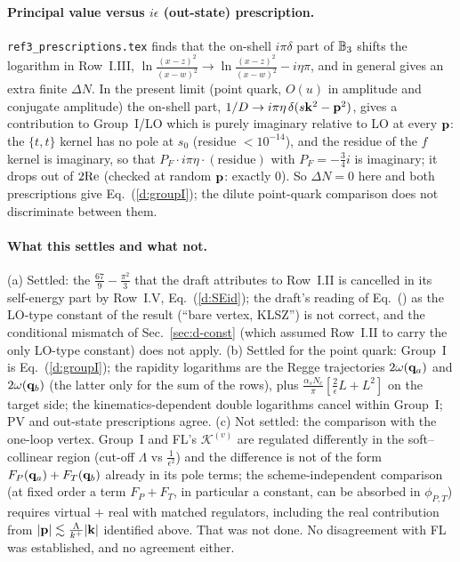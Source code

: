 \paragraph{Principal value versus $i\epsilon$ (out-state) prescription.} \texttt{ref3\_prescriptions.tex} finds that the on-shell $i\pi\delta$ part of $\mathbb{B}_3$ shifts the logarithm in Row~I.III, $\ln\frac{(x-z)^2}{(x-w)^2}\to\ln\frac{(x-z)^2}{(x-w)^2}-i\eta\pi$, and in general gives an extra finite $\Delta N$. In the present limit (point quark, $O(u)$ in amplitude and conjugate amplitude) the on-shell part, $1/D\to i\pi\eta\,\delta(s\mathbf{k}^2-\mathbf{p}^2)$, gives a contribution to Group~I/LO which is purely imaginary relative to LO at every $\mathbf{p}$: the $\{t,t\}$ kernel has no pole at $s_0$ (residue $<10^{-14}$), and the residue of the $f$ kernel is imaginary, so that $P_F\cdot i\pi\eta\cdot(\text{residue})$ with $P_F=-\frac34i$ is imaginary; it drops out of $2{\rm Re}$ (checked at random $\mathbf{p}$: exactly $0$). So $\Delta N=0$ here and both prescriptions give Eq.~(\ref{d:groupI}); the dilute point-quark comparison does not discriminate between them.

\paragraph{What this settles and what not.} (a) Settled: the $\frac{67}{9}-\frac{\pi^2}{3}$ that the draft attributes to Row~I.II is cancelled in its self-energy part by Row~I.V, Eq.~(\ref{d:SEid}); the draft's reading of Eq.~() as the LO-type constant of the result (``bare vertex, KLSZ'') is not correct, and the conditional mismatch of Sec.~\ref{sec:d-const} (which assumed Row~I.II to carry the only LO-type constant) does not apply. (b) Settled for the point quark: Group~I is Eq.~(\ref{d:groupI}); the rapidity logarithms are the Regge trajectories $2\omega(\mathbf{q}_a)$ and $2\omega(\mathbf{q}_b)$ (the latter only for the sum of the rows), plus $\frac{\alpha_sN_c}{\pi}[\frac2\epsilon L+L^2]$ on the target side; the kinematics-dependent double logarithms cancel within Group~I; PV and out-state prescriptions agree. (c) Not settled: the comparison with the one-loop vertex. Group~I and FL's $\mathcal K^{(v)}$ are regulated differently in the soft--collinear region (cut-off $\Lambda$ vs $\frac{1}{\epsilon^2}$) and the difference is not of the form $F_P(\mathbf{q}_a)+F_T(\mathbf{q}_b)$ already in its pole terms; the scheme-independent comparison (at fixed order a term $F_P+F_T$, in particular a constant, can be absorbed in $\phi_{P,T}$) requires virtual $+$ real with matched regulators, including the real contribution from $|\mathbf{p}|\lesssim\frac{\Lambda}{k^+}|\mathbf{k}|$ identified above. That was not done. No disagreement with FL was established, and no agreement either.

